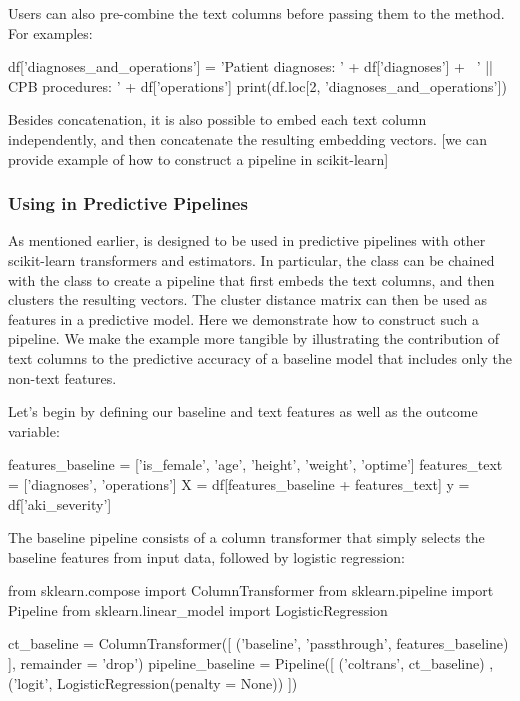 \documentclass[article]{jss}
\begin{document}
Users can also pre-combine the text columns before passing them to the  method. For examples:
\begin{pyblock}
df['diagnoses_and_operations'] = 'Patient diagnoses: ' + df['diagnoses'] + \ 
  ' || CPB procedures: ' + df['operations']
print(df.loc[2, 'diagnoses_and_operations'])
\end{pyblock}
\stdoutpythontex %

Besides concatenation, it is also possible to embed each text column independently, and then concatenate the resulting embedding vectors. [we can provide example of how to construct a pipeline in scikit-learn]

\subsubsection[Using TabuLLM in Predictive Pipelines]{Using  in Predictive Pipelines}\label{subsubsec:using-predictive-pipelines}

As mentioned earlier,  is designed to be used in predictive pipelines with other scikit-learn transformers and estimators. In particular, the  class can be chained with the  class to create a pipeline that first embeds the text columns, and then clusters the resulting vectors. The cluster distance matrix can then be used as features in a predictive model. Here we demonstrate how to construct such a pipeline. We make the example more tangible by illustrating the contribution of text columns to the predictive accuracy of a baseline model that includes only the non-text features.

Let's begin by defining our baseline and text features as well as the outcome variable:
\begin{pyblock}
features_baseline = ['is_female', 'age', 'height', 'weight', 'optime']
features_text = ['diagnoses', 'operations']
X = df[features_baseline + features_text]
y = df['aki_severity']
\end{pyblock}

The baseline pipeline consists of a column transformer that simply selects the baseline features from input data, followed by logistic regression:
\begin{pyblock}
from sklearn.compose import ColumnTransformer
from sklearn.pipeline import Pipeline
from sklearn.linear_model import LogisticRegression

ct_baseline = ColumnTransformer([
    ('baseline', 'passthrough', features_baseline)
], remainder = 'drop')
pipeline_baseline = Pipeline([
    ('coltrans', ct_baseline)
    , ('logit', LogisticRegression(penalty = None))
])
\end{pyblock}
\end{document}
